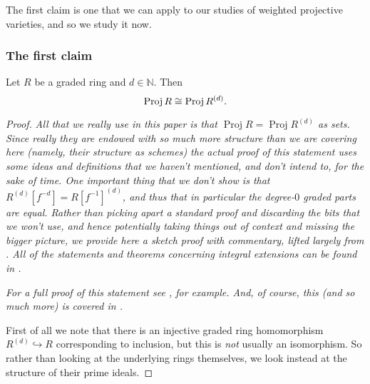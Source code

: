 \documentclass[10pt,notitlepage]{article}
\numberwithin{equation}{subsection}
\DeclareMathOperator{\proj}{Proj}
\newcommand{\nn}{\mathbb{N}}
\begin{document}
    The first claim is one that we can apply to our studies of weighted projective varieties, and so we study it now.



        \subsubsection{The first claim} %
        \label{ssub:the_first_claim}

        \begin{theorem}\label{thm:proj-truncation-iso}
            Let $R$ be a graded ring and $d\in\nn$.
            Then
            \[\proj R\cong \proj R^{(d)}.\qedhere\]
        \end{theorem}

        \begin{proof}
            \emph{All that we really use in this paper is that $\proj R=\proj R^{(d)}$ \emph{as sets}.
            Since really they are endowed with so much more structure than we are covering here (namely, their structure as \emph{schemes}) the actual proof of this statement uses some ideas and definitions that we haven't mentioned, and don't intend to, for the sake of time.
            One important thing that we don't show is that $R^{(d)}[f^{-d}]=R[f^{-1}]^{(d)}$, and thus that in particular the degree-$0$ graded parts are equal.
            Rather than picking apart a standard proof and discarding the bits that we won't use, and hence potentially taking things out of context and missing the bigger picture, we provide here a sketch proof with commentary, lifted largely from \cite[Exercise~9.5]{Eisenbud:1995tm}.
            All of the statements and theorems concerning integral extensions can be found in \cite[Chapter~4.4]{Eisenbud:1995tm}.}

            \emph{For a full proof of this statement see \cite[Proposition~5.5.2]{Tevelev:jdT35_ao}, for example.
            And, of course, this (and so much more) is covered in \cite[Proposition~(2.4.7)]{Grothendieck:1961tr}.}

            \bigskip

            First of all we note that there is an injective graded ring homomorphism $R^{(d)}\hookrightarrow R$ corresponding to inclusion, but this is \emph{not} usually an isomorphism.
            So rather than looking at the underlying rings themselves, we look instead at the structure of their prime ideals.


\end{proof}
\end{document}
